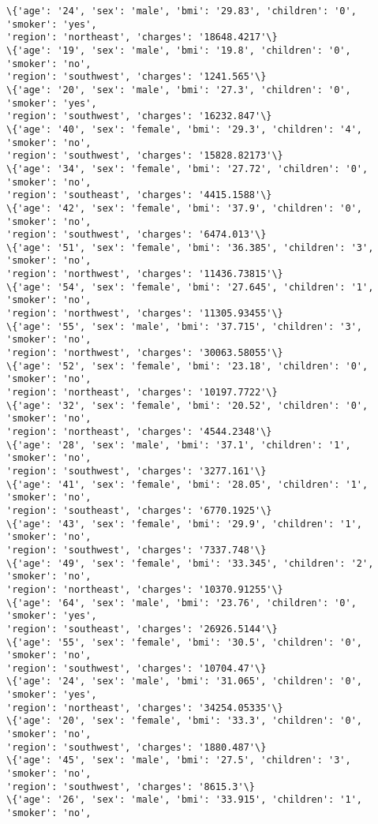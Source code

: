 \documentclass[11pt]{article}
\begin{document}
\begin{Verbatim}[commandchars=\\\{\}]
\{'age': '24', 'sex': 'male', 'bmi': '29.83', 'children': '0', 'smoker': 'yes',
'region': 'northeast', 'charges': '18648.4217'\}
\{'age': '19', 'sex': 'male', 'bmi': '19.8', 'children': '0', 'smoker': 'no',
'region': 'southwest', 'charges': '1241.565'\}
\{'age': '20', 'sex': 'male', 'bmi': '27.3', 'children': '0', 'smoker': 'yes',
'region': 'southwest', 'charges': '16232.847'\}
\{'age': '40', 'sex': 'female', 'bmi': '29.3', 'children': '4', 'smoker': 'no',
'region': 'southwest', 'charges': '15828.82173'\}
\{'age': '34', 'sex': 'female', 'bmi': '27.72', 'children': '0', 'smoker': 'no',
'region': 'southeast', 'charges': '4415.1588'\}
\{'age': '42', 'sex': 'female', 'bmi': '37.9', 'children': '0', 'smoker': 'no',
'region': 'southwest', 'charges': '6474.013'\}
\{'age': '51', 'sex': 'female', 'bmi': '36.385', 'children': '3', 'smoker': 'no',
'region': 'northwest', 'charges': '11436.73815'\}
\{'age': '54', 'sex': 'female', 'bmi': '27.645', 'children': '1', 'smoker': 'no',
'region': 'northwest', 'charges': '11305.93455'\}
\{'age': '55', 'sex': 'male', 'bmi': '37.715', 'children': '3', 'smoker': 'no',
'region': 'northwest', 'charges': '30063.58055'\}
\{'age': '52', 'sex': 'female', 'bmi': '23.18', 'children': '0', 'smoker': 'no',
'region': 'northeast', 'charges': '10197.7722'\}
\{'age': '32', 'sex': 'female', 'bmi': '20.52', 'children': '0', 'smoker': 'no',
'region': 'northeast', 'charges': '4544.2348'\}
\{'age': '28', 'sex': 'male', 'bmi': '37.1', 'children': '1', 'smoker': 'no',
'region': 'southwest', 'charges': '3277.161'\}
\{'age': '41', 'sex': 'female', 'bmi': '28.05', 'children': '1', 'smoker': 'no',
'region': 'southeast', 'charges': '6770.1925'\}
\{'age': '43', 'sex': 'female', 'bmi': '29.9', 'children': '1', 'smoker': 'no',
'region': 'southwest', 'charges': '7337.748'\}
\{'age': '49', 'sex': 'female', 'bmi': '33.345', 'children': '2', 'smoker': 'no',
'region': 'northeast', 'charges': '10370.91255'\}
\{'age': '64', 'sex': 'male', 'bmi': '23.76', 'children': '0', 'smoker': 'yes',
'region': 'southeast', 'charges': '26926.5144'\}
\{'age': '55', 'sex': 'female', 'bmi': '30.5', 'children': '0', 'smoker': 'no',
'region': 'southwest', 'charges': '10704.47'\}
\{'age': '24', 'sex': 'male', 'bmi': '31.065', 'children': '0', 'smoker': 'yes',
'region': 'northeast', 'charges': '34254.05335'\}
\{'age': '20', 'sex': 'female', 'bmi': '33.3', 'children': '0', 'smoker': 'no',
'region': 'southwest', 'charges': '1880.487'\}
\{'age': '45', 'sex': 'male', 'bmi': '27.5', 'children': '3', 'smoker': 'no',
'region': 'southwest', 'charges': '8615.3'\}
\{'age': '26', 'sex': 'male', 'bmi': '33.915', 'children': '1', 'smoker': 'no',

\end{Verbatim}
\end{document}

